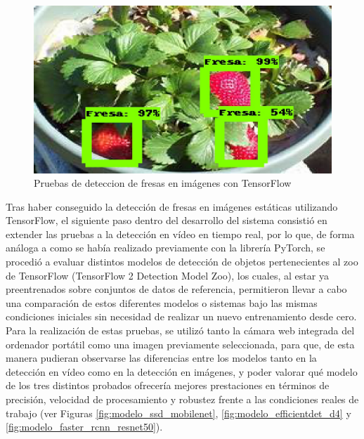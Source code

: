 \begin{figure}[H]
\begin{minipage}{0.45\textwidth}
  \end{minipage}
  \hspace{2mm}
  \begin{minipage}{0.45\textwidth}
    \centering
    \includegraphics[width=\linewidth]{figs/1000.jpeg}
  \end{minipage}
  \caption{Pruebas de deteccion de fresas en imágenes con TensorFlow}
  \label{fig:Deteccion_Fresas_Imagenes_TF}
  \end{figure}

Tras haber conseguido la detección de fresas en imágenes estáticas utilizando TensorFlow, el siguiente paso dentro del desarrollo del sistema consistió en extender las pruebas a la detección en vídeo en tiempo real, por lo que, de forma análoga a como se había realizado previamente con la librería PyTorch, se procedió a evaluar distintos modelos de detección de objetos pertenecientes al zoo de TensorFlow (TensorFlow 2 Detection Model Zoo), los cuales, al estar ya preentrenados sobre conjuntos de datos de referencia, permitieron llevar a cabo una comparación de estos diferentes modelos o sistemas bajo las mismas condiciones iniciales sin necesidad de realizar un nuevo entrenamiento desde cero. Para la realización de estas pruebas, se utilizó tanto la cámara web integrada del ordenador portátil como una imagen previamente seleccionada, para que, de esta manera pudieran observarse las diferencias entre los modelos tanto en la detección en vídeo como en la detección en imágenes, y poder valorar qué modelo de los tres distintos probados ofrecería mejores prestaciones en términos de precisión, velocidad de procesamiento y robustez frente a las condiciones reales de trabajo (ver Figuras  \ref{fig:modelo_ssd_mobilenet}, \ref{fig:modelo_efficientdet_d4} y \ref{fig:modelo_faster_rcnn_resnet50}). 

